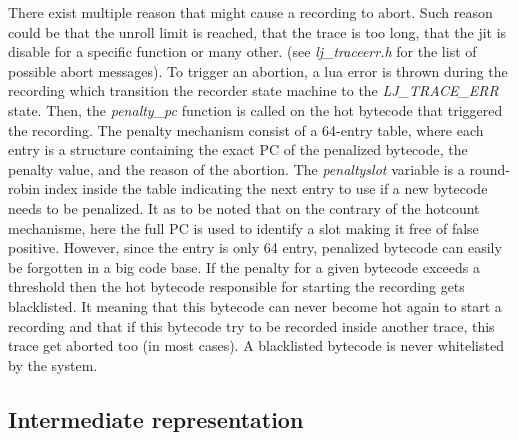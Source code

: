 There exist multiple reason that might cause a recording to abort. Such reason
could be that the unroll limit is reached, that the trace is too long, that the
jit is disable for a specific function or many other. (see \emph{lj\_traceerr.h}
for the list of possible abort messages). To trigger an abortion, a lua error is
thrown during the recording which transition the recorder state machine to the
\emph{LJ\_TRACE\_ERR} state. Then, the \emph{penalty\_pc} function is called on
the hot bytecode that triggered the recording. The penalty mechanism consist of
a 64-entry table, where each entry is a structure containing the exact PC of the
penalized bytecode, the penalty value, and the reason of the abortion. The
\emph{penaltyslot} variable is a round-robin index inside the table indicating
the next entry to use if a new bytecode needs to be penalized. It as to be noted
that on the contrary of the hotcount mechanisme, here the full PC is used to
identify a slot making it free of false positive. However, since the entry is
only 64 entry, penalized bytecode can easily be forgotten in a big code base.
If the penalty for a given bytecode exceeds a threshold then the hot bytecode
responsible for starting the recording gets blacklisted. It meaning that this
bytecode can never become hot again to start a recording and that if this
bytecode try to be recorded inside another trace, this trace get aborted too
(in most cases). A blacklisted bytecode is never whitelisted by the system.


\subsection{Intermediate representation}
\label{Subsec:IR}


